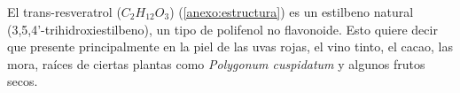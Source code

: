 El trans-resveratrol ($C_2H_12O_3$) (\ref{anexo:estructura}) es un estilbeno natural (3,5,4'-trihidroxiestilbeno),
un tipo de polifenol no flavonoide. Esto quiere decir que 
 presente principalmente en la piel de las uvas rojas,
el vino tinto, el cacao, las mora, raíces de ciertas plantas como \textit{Polygonum cuspidatum}
 y algunos frutos secos.